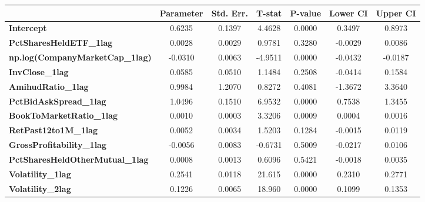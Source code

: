 \begin{center}
\begin{tabular}{lclc}
\bottomrule
\end{tabular}
\begin{tabular}{lcccccc}
                                        & \textbf{Parameter} & \textbf{Std. Err.} & \textbf{T-stat} & \textbf{P-value} & \textbf{Lower CI} & \textbf{Upper CI}  \\
\midrule
\textbf{Intercept}                      &       0.6235       &       0.1397       &      4.4628     &      0.0000      &       0.3497      &       0.8973       \\
\textbf{PctSharesHeldETF\_1lag}         &       0.0028       &       0.0029       &      0.9781     &      0.3280      &      -0.0029      &       0.0086       \\
\textbf{np.log(CompanyMarketCap\_1lag)} &      -0.0310       &       0.0063       &     -4.9511     &      0.0000      &      -0.0432      &      -0.0187       \\
\textbf{InvClose\_1lag}                 &       0.0585       &       0.0510       &      1.1484     &      0.2508      &      -0.0414      &       0.1584       \\
\textbf{AmihudRatio\_1lag}              &       0.9984       &       1.2070       &      0.8272     &      0.4081      &      -1.3672      &       3.3640       \\
\textbf{PctBidAskSpread\_1lag}          &       1.0496       &       0.1510       &      6.9532     &      0.0000      &       0.7538      &       1.3455       \\
\textbf{BookToMarketRatio\_1lag}        &       0.0010       &       0.0003       &      3.3206     &      0.0009      &       0.0004      &       0.0016       \\
\textbf{RetPast12to1M\_1lag}            &       0.0052       &       0.0034       &      1.5203     &      0.1284      &      -0.0015      &       0.0119       \\
\textbf{GrossProfitability\_1lag}       &      -0.0056       &       0.0083       &     -0.6731     &      0.5009      &      -0.0217      &       0.0106       \\
\textbf{PctSharesHeldOtherMutual\_1lag} &       0.0008       &       0.0013       &      0.6096     &      0.5421      &      -0.0018      &       0.0035       \\
\textbf{Volatility\_1lag}               &       0.2541       &       0.0118       &      21.615     &      0.0000      &       0.2310      &       0.2771       \\
\textbf{Volatility\_2lag}               &       0.1226       &       0.0065       &      18.960     &      0.0000      &       0.1099      &       0.1353       \\

\end{tabular}
\end{center}
